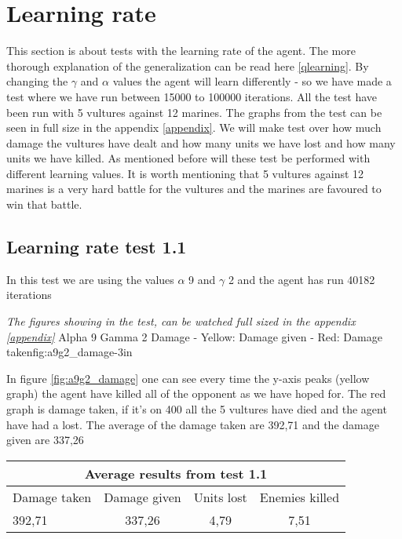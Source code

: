 \section{Learning rate}
This section is about tests with the learning rate of the agent. The more thorough explanation of the generalization can be read here \ref{qlearning}.
By changing the $\gamma$ and $\alpha$ values the agent will learn differently - so we have made a test where we have run between 15000 to 100000 iterations. All the test have been run with 5 vultures against 12 marines. The graphs from the test can be seen in full size in the appendix \ref{appendix}. We will make test over how much damage the vultures have dealt and how many units we have lost and how many units we have killed. As mentioned before will these test be performed with different learning values. It is worth mentioning that 5 vultures against 12 marines is a very hard battle for the vultures and the marines are favoured to win that battle.



\subsection*{Learning rate test 1.1}
In this test we are using the values $\alpha$ 9 and $\gamma$ 2 and the agent has run 40182 iterations


\textit{The figures showing in the test, can be watched full sized in the appendix \ref{appendix}} 
			{Alpha 9 Gamma 2 Damage - Yellow: Damage given - Red: Damage taken}{fig:a9g2_damage}{-3in}

In figure \ref{fig:a9g2_damage} one can see every time the y-axis peaks (yellow graph) the agent have killed all of the opponent as we have hoped for. The red graph is damage taken, if it's on 400 all the 5 vultures have died and the agent have had a lost. The average of the damage taken are 392,71 and the damage given are 337,26


\begin{centering}
 \begin{tabular}{|l||c|c|c|}
	\multicolumn{4}{c}{Average results from test 1.1} \\
	\hline
		Damage taken & Damage given & Units lost & Enemies killed\\
	\hline
		392,71 & 337,26 & 4,79 & 7,51 \\
	\hline

\end{tabular}
\end{centering}

